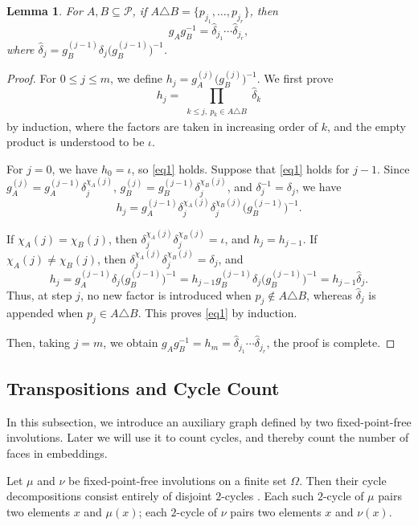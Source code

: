\documentclass[10pt,a4paper]{amsart}
\newtheorem{lemma}[theorem]{Lemma}
\begin{document}
\begin{lemma}
\label{lem2:8}
For $A,B\subseteq\mathcal P$,
if $A\triangle B=\{p_{j_1},\ldots,p_{j_r}\}$, then
$$g_Ag_B^{-1}
=
\widehat\delta_{j_1}\cdots\widehat\delta_{j_r},$$
where
$\widehat\delta_j
=g_B^{(j-1)}\delta_j\bigl(g_B^{(j-1)}\bigr)^{-1}$.
\end{lemma}
\begin{proof}
For $0\le j\le m$, we define
$h_j=g_A^{(j)}\bigl(g_B^{(j)}\bigr)^{-1}$.
We first prove
\begin{equation}
h_j=
\prod_{\substack{k\le j,\ p_k\in A\triangle B}}
\widehat\delta_k
\label{eq1}
\end{equation}
by induction, where the factors are taken in increasing order of $k$, and the empty product is understood to be $\iota$.

For $j=0$, we have $h_0=\iota$, so \eqref{eq1} holds. Suppose that \eqref{eq1} holds for $j-1$. Since
$g_A^{(j)}=g_A^{(j-1)}\delta_j^{\chi_A(j)}$,
$g_B^{(j)}=g_B^{(j-1)}\delta_j^{\chi_B(j)}$,
and $\delta_j^{-1}=\delta_j$, we have
$$h_j=g_A^{(j-1)}
\delta_j^{\chi_A(j)}
\delta_j^{\chi_B(j)}
\bigl(g_B^{(j-1)}\bigr)^{-1}.$$

If $\chi_A(j)=\chi_B(j)$, then
$\delta_j^{\chi_A(j)}\delta_j^{\chi_B(j)}=\iota$, and
$h_j=h_{j-1}$. If $\chi_A(j)\ne\chi_B(j)$, then
$\delta_j^{\chi_A(j)}\delta_j^{\chi_B(j)}=\delta_j$, and
$$
h_j
=
g_A^{(j-1)}\delta_j
\bigl(g_B^{(j-1)}\bigr)^{-1}
=
h_{j-1}
g_B^{(j-1)}\delta_j
\bigl(g_B^{(j-1)}\bigr)^{-1}
=
h_{j-1}\widehat\delta_j.
$$
Thus, at step $j$, no new factor is introduced when
$p_j\notin A\triangle B$, whereas $\widehat\delta_j$ is appended when
$p_j\in A\triangle B$. This proves \eqref{eq1} by induction.

Then, taking $j=m$, we obtain
$g_Ag_B^{-1}=h_m
=\widehat\delta_{j_1}\cdots\widehat\delta_{j_r}$, the proof is complete.
\end{proof}


\subsection{Transpositions and Cycle Count}
In this subsection, we introduce an auxiliary graph defined by two fixed-point-free involutions. Later we will use it to count cycles, and thereby count the number of faces in embeddings.

Let $\mu$ and $\nu$ be fixed-point-free involutions on a finite set
$\Omega$. Then their cycle decompositions consist entirely of disjoint $2$-cycles .
Each such $2$-cycle of $\mu$ pairs two elements $x$ and $\mu(x)$;
each $2$-cycle of $\nu$ pairs two elements $x$ and $\nu(x)$.
\end{document}
